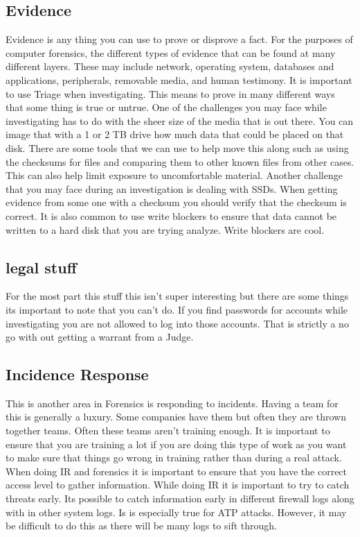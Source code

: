 \documentclass[letterpaper, onecolumn,10pt]{IEEEtran}
\begin{document}
            \subsection{Evidence}
            Evidence is any thing you can use to prove or disprove a fact. For the purposes of computer forensics, the different types of evidence that can be found at many different layers. These may include network, operating system, databases and applications, peripherals, removable media, and human testimony. It is important to use Triage when investigating. This means to prove in many different ways that some thing is true or untrue. One of the challenges you may face while investigating has to do with the sheer size of the media that is out there. You can image that with a 1 or 2 TB drive how much data that could be placed on that disk. There are some tools that we can use to help move this along such as using the checksums for files and comparing them to other known files from other cases. This can also help limit exposure to uncomfortable material. Another challenge that you may face during an investigation is dealing with SSDs. When getting evidence from some one with a checksum you should verify that the checksum is correct. It is also common to use write blockers to ensure that data cannot be written to a hard disk that you are trying analyze. Write blockers are cool.\\
            
            \subsection{legal stuff} For the most part this stuff this isn't super interesting but there are some things its important to note that you can't do. If you find passwords for accounts while investigating you are not allowed to log into those accounts. That is strictly a no go with out getting a warrant from a Judge.\\
            
            \subsection{Incidence Response} This is another area in Forensics is responding to incidents. Having a team for this is generally a luxury. Some companies have them but often they are thrown together teams. Often these teams aren't training enough. It is important to ensure that you are training a lot if you are doing this type of work as you want to make sure that things go wrong in training rather than during a real attack. When doing IR and forensics it is important to ensure that you have the correct access level to gather information. While doing IR it is important to try to catch threats early. Its possible to catch information early in different firewall logs along with in other system logs. Is is especially true for ATP attacks. However, it may be difficult to do this as there will be many logs to sift through.\\
            
\end{document}
